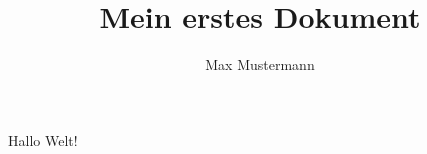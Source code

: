 \documentclass[12pt,ngerman]{scrartcl}
\author{Max Mustermann}
\title{Mein erstes Dokument}
\begin{document}
\maketitle

Hallo Welt!
\end{document}
